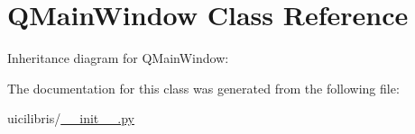 \hypertarget{classQMainWindow}{\section{\-Q\-Main\-Window \-Class \-Reference}
\label{classQMainWindow}
}


\-Inheritance diagram for \-Q\-Main\-Window\-:


\-The documentation for this class was generated from the following file\-:\begin{DoxyCompactItemize}
\item 
uicilibris/\hyperlink{____init_____8py}{\-\_\-\-\_\-init\-\_\-\-\_\-.\-py}\end{DoxyCompactItemize}
